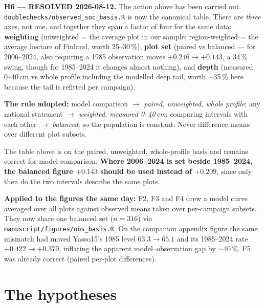 \documentclass[11pt]{article}
\begin{document}
\begin{caveat}
\textbf{H6 --- RESOLVED 2026-08-12.} The action above has been carried out.
\texttt{doublechecks/observed\_soc\_basis.R} is now the canonical table. There are \emph{three}
axes, not one, and together they span a factor of four for the same data:
\textbf{weighting} (unweighted = the average plot in our sample; region-weighted = the average
hectare of Finland, worth 25--30\,\%), \textbf{plot set} (paired vs balanced --- for 2006--2024,
also requiring a 1985 observation moves $+0.216 \to +0.143$, a 34\,\% swing, though for 1985--2024
it changes almost nothing), and \textbf{depth} (measured 0--40\,cm vs whole profile including the
modelled deep tail, worth $\sim$35\,\% here because the tail is refitted per campaign).

\smallskip
\textbf{The rule adopted:} model comparison $\to$ \emph{paired, unweighted, whole profile};
any national statement $\to$ \emph{weighted, measured 0--40\,cm}; comparing intervals with each
other $\to$ \emph{balanced}, so the population is constant. Never difference means over different
plot subsets.

\smallskip
The table above is on the paired, unweighted, whole-profile basis and remains correct for model
comparison. \textbf{Where 2006--2024 is set beside 1985--2024, the balanced figure $+0.143$ should
be used instead of $+0.209$}, since only then do the two intervals describe the same plots.

\smallskip
\textbf{Applied to the figures the same day:} F2, F3 and F4 drew a model curve averaged over all
plots against observed means taken over per-campaign subsets. They now share one balanced set
($n=316$) via \texttt{manuscript/figures/obs\_basis.R}. On the companion appendix figure the same
mismatch had moved Yasso15's 1985 level $63.3 \to 65.1$ and its 1985--2024 rate
$+0.422 \to +0.379$, inflating the apparent model--observation gap by $\sim$40\,\%. F5 was already
correct (paired per-plot differences).
\end{caveat}

\section{The hypotheses}
\end{document}
